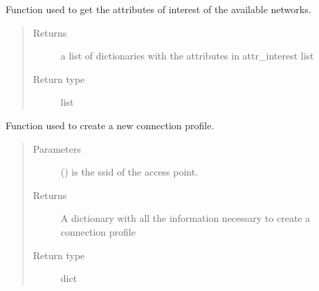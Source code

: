 \documentclass[letterpaper,10pt,english]{sphinxhowto}
\begin{document}

\begin{fulllineitems}
\label{\detokenize{index:nm_dbus_python.get_all_ap_info}}
Function used to get the attributes of interest of the available networks.
\begin{quote}\begin{description}
\item[{Returns}] \leavevmode
a list of dictionaries with the attributes in attr\_interest list

\item[{Return type}] \leavevmode
list

\end{description}\end{quote}

\end{fulllineitems}


\begin{fulllineitems}
\label{\detokenize{index:nm_dbus_python.create_connProfile}}
Function used to create a new connection profile.
\begin{quote}\begin{description}
\item[{Parameters}] \leavevmode
{} () \textendash{} is the ssid of the access point.

\item[{Returns}] \leavevmode
A dictionary with all the information necessary to create a connection profile

\item[{Return type}] \leavevmode
dict

\end{description}\end{quote}

\end{fulllineitems}
\end{document}
